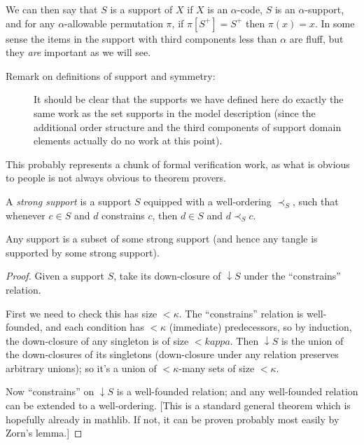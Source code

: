 We can then say that $S$ is a support of $X$ if $X$ is an $\alpha$-code, $S$ is an $\alpha$-support, and for any $\alpha$-allowable permutation $\pi$, if $\pi[S^+]=S^+$ then $\pi(x)=x$.  In some sense the items in the support with third components less than $\alpha$ are fluff, but they {\em are\/} important as we will see.

\begin{description}
\item[Remark on definitions of support and symmetry:]  It should be clear that the supports we have defined here do exactly the same work as the set supports in the model description (since the additional order structure and the third components of support domain elements actually do no work at this point).
\end{description}

This probably represents a chunk of formal verification work, as what is obvious to people is not always obvious to theorem provers.

\begin{definition}
  \label{def:strong-support}
  A \emph{strong support} is a support $S$ equipped with a well-ordering $\prec_S$, such that whenever $c \in S$ and $d$ constrains $c$, then $d \in S$ and $d \prec_S c$.
\end{definition}

\begin{lemma}
  \label{lem:strengthen-support}
  Any support is a subset of some strong support (and hence any tangle is supported by some strong support).
\end{lemma}

\begin{proof}
  Given a support $S$, take its down-closure of $\downarrow S$ under the “constrains” relation.

  First we need to check this has size $<\kappa$.  The “constrains” relation is well-founded, and each condition has $<\kappa$ (immediate) predecessors, so by induction, the down-closure of any singleton is of size $<kappa$. Then $ \downarrow S$ is the union of the down-closures of its singletons (down-closure under any relation preserves arbitrary unions); so it’s a union of $<\kappa$-many sets of size $<\kappa$.

  Now “constrains” on $\downarrow S$ is a well-founded relation; and any well-founded relation can be extended to a well-ordering.  [This is a standard general theorem which is hopefully already in mathlib. If not, it can be proven probably most easily by Zorn’s lemma.]
\end{proof}

